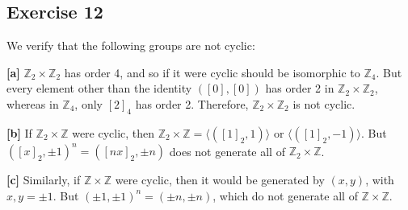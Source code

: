 \subsection*{Exercise 12}
We verify that the following groups are not cyclic:

\textbf{[a]} $\mathbb{Z}_2 \times \mathbb{Z}_2$ has order 4, and so if it were cyclic should be isomorphic to $\mathbb{Z}_4$. But every element other than the identity $([0],[0])$ has order 2 in $\mathbb{Z}_2 \times \mathbb{Z}_2$, whereas in $\mathbb{Z}_4$, only $[2]_4$ has order 2. Therefore, $\mathbb{Z}_2 \times \mathbb{Z}_2$ is not cyclic.

\textbf{[b]} If $\mathbb{Z}_2 \times \mathbb{Z}$ were cyclic, then $\mathbb{Z}_2 \times \mathbb{Z} = \langle ([1]_2, 1) \rangle$ or $\langle ([1]_2, -1) \rangle$. But $([x]_2,\pm1)^n = ([nx]_2,\pm n)$ does not generate all of $\mathbb{Z}_2 \times \mathbb{Z}$.

\textbf{[c]} Similarly, if $\mathbb{Z} \times \mathbb{Z}$ were cyclic, then it would be generated by $(x,y)$, with $x,y = \pm 1$. But $(\pm1, \pm1)^n = (\pm n, \pm n)$, which do not generate all of $\mathbb{Z}\times\mathbb{Z}$.